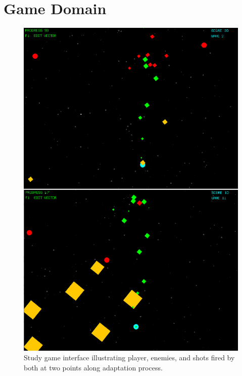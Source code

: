 \documentclass{sig-alternate}
\begin{document}






\section{Game Domain}

\begin{figure}[t]
\centering
\includegraphics[width=1\linewidth]{./bullethell_topbybottom}
\caption{Study game interface illustrating player, enemies, and shots fired by both at two points along adaptation process.}
\label{fig:shmup}
\end{figure}
\end{document}
